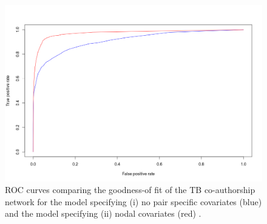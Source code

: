 \begin{figure}[!h]
\centering
\includegraphics[scale=0.5]{Chapters/tb/statMod/tb_lnm_ROC.png}
\caption{ROC curves comparing the goodness-of fit of the TB co-authorship network for the model specifying (i) no pair specific covariates (blue) and the model specifying (ii) nodal covariates (red)%
.}
\label{fig:tb_lnm_roc}
\end{figure}~\\~\\

\pagebreak
